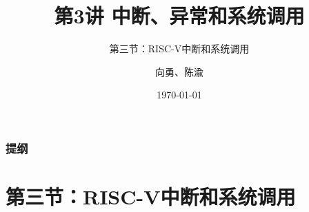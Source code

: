 


\title[第3讲]{第3讲 中断、异常和系统调用} %
\subtitle{第三节：RISC-V中断和系统调用}
\author{向勇、陈渝} %
\date{\today} %



\begin{frame}
\titlepage %
\end{frame}
\begin{frame}
\frametitle{提纲} %
\tableofcontents %
\end{frame}

\section{第三节：RISC-V中断和系统调用}%
% 
% 

